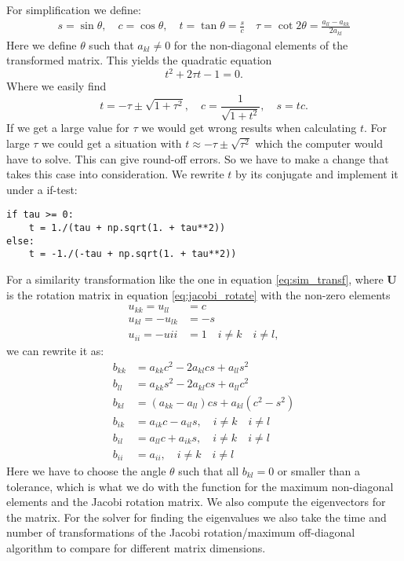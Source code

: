\documentclass[12pt,a4paper,english]{article}
\begin{document}
For simplification we define:
\begin{align*}
s = \sin\theta,\quad c=\cos\theta, \quad t=\tan\theta=\frac{s}{c}\quad \tau=\cot2\theta=\frac{a_{ll}-a_{kk}}{2a_{kl}}
\end{align*}
Here we define $\theta$ such that $a_{kl}\neq0$ for the non-diagonal elements of the transformed matrix. This yields the quadratic equation
\[t^2+2\tau t-1=0.\]
Where we easily find
\[t=-\tau\pm\sqrt{1+\tau^2},\quad c=\frac{1}{\sqrt{1+t^2}},\quad s=tc.\]
If we get a large value for $\tau$ we would get wrong results when calculating $t$. For large $\tau$ we could get a situation with $t\approx-\tau\pm\sqrt{\tau^2}$ which the computer would have to solve. This can give round-off errors. So we have to make a change that takes this case into consideration. We rewrite $t$ by its conjugate and implement it under a if-test:
\begin{lstlisting}
if tau >= 0:
	t = 1./(tau + np.sqrt(1. + tau**2))
else:
	t = -1./(-tau + np.sqrt(1. + tau**2))
\end{lstlisting}
For a similarity transformation like the one in equation \ref{eq:sim_transf}, where \textbf{U} is the rotation matrix in equation \ref{eq:jacobi_rotate} with the non-zero elements 
\begin{align*}
u_{kk} = u_{ll} &= c\\
u_{kl} = -u_{lk} &= -s\\
u_{ii} = -u{ii} &= 1\quad i\neq k\quad i\neq l,
\end{align*}
we can rewrite it as:
\begin{align*}
b_{kk} &= a_{kk} c^2 - 2a_{kl}cs + a_{ll} s^2\\
b_{ll} &= a_{kk} s^2 - 2a_{kl}cs + a_{ll} c^2\\
b_{kl} &= (a_{kk} - a_{ll})cs + a_{kl}(c^2-s^2)\\
b_{ik} &= a_{ik}c - a_{il}s, \quad i\neq k\quad i\neq l\\
b_{il} &= a_{ll}c + a_{ik}s, \quad i\neq k\quad i\neq l\\
b_{ii} &= a_{ii}, \quad i\neq k\quad i\neq l
\end{align*}
Here we have to choose the angle $\theta$ such that all $b_{kl}=0$ or smaller than a tolerance, which is what we do with the function for the maximum non-diagonal elements and the Jacobi rotation matrix. We also compute the eigenvectors for the matrix. For the solver for finding the eigenvalues we also take the time and number of transformations of the Jacobi rotation/maximum off-diagonal algorithm to compare for different matrix dimensions.
\end{document}
